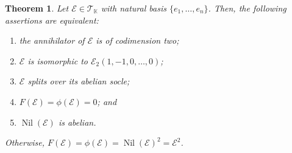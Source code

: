 \documentclass[12pt,reqno]{amsart}
\newtheorem{theorem}{Theorem}[section]
\theoremstyle{definition}
\theoremstyle{remark}
\DeclareMathOperator{\nil}{Nil}
\numberwithin{equation}{section}
\begin{document}
\begin{theorem}\label{th:nilrad_abelian}
	Let $\mathcal{E}\in\mathcal{T}_\mathbb{K}$ with natural basis $\{e_1,\dots,e_n\}$. Then, the following assertions are equivalent:
	\begin{enumerate}[\rm (i)]
		\item the annihilator of $\mathcal{E}$ is of codimension two;
		\item $\mathcal{E}$ is isomorphic to $\mathcal{E}_2(1,-1,0,\dots,0)$;
		\item $\mathcal{E}$ splits over its abelian socle;
		\item $F(\mathcal{E})=\phi(\mathcal{E})=0$; and 
		\item $\nil(\mathcal{E})$ is abelian.
	\end{enumerate}
	Otherwise, $F(\mathcal{E})=\phi(\mathcal{E})=\nil(\mathcal{E})^2=\mathcal{E}^2$.
\end{theorem}
\end{document}
